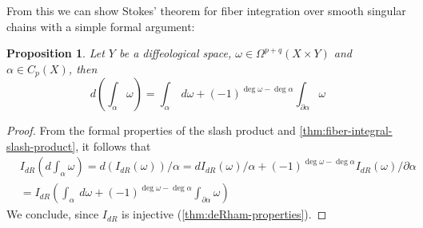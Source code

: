 \documentclass{scrartcl}
\theoremstyle{plain}
\newtheorem{theorem}{Theorem}[section]
\newtheorem{proposition}[theorem]{Proposition}
\theoremstyle{definition}
\begin{document}
From this we can show Stokes' theorem for fiber integration over smooth singular chains with a simple formal argument:
\begin{proposition}
    Let $Y$ be a diffeological space, $\omega\in\Omega^{p+q}(X\times Y)$ and $\alpha\in C_p(X)$, then
    $$d\left(\int_\alpha\omega\right) = \int_\alpha\ d\omega + (-1)^{\deg \omega - \deg\alpha}\int_{\partial \alpha} \omega$$
\end{proposition}
\begin{proof}
    From the formal properties of the slash product and \ref{thm:fiber-integral-slash-product}, it follows that
    \begin{align*}
        &I_{dR}\left(d\int_\alpha\omega\right) = d (I_{dR}(\omega)) / \alpha = dI_{dR}(\omega) / \alpha + (-1)^{\deg \omega - \deg \alpha}I_{dR}(\omega) / \partial \alpha \\&= I_{dR}\left(\int_\alpha\ d\omega + (-1)^{\deg \omega - \deg\alpha}\int_{\partial \alpha} \omega\right)
    \end{align*}
    We conclude, since $I_{dR}$ is injective (\ref{thm:deRham-properties}).
\end{proof}


\end{document}
